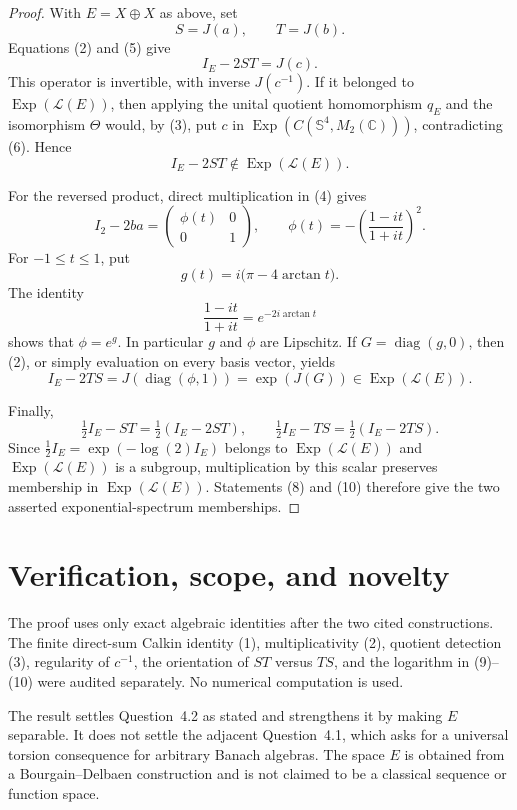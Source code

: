 \documentclass[11pt]{article}
\theoremstyle{remark}
\newcommand{\C}{\mathbb C}
\newcommand{\Sph}{\mathbb S}
\newcommand{\cL}{\mathcal L}
\newcommand{\Exp}{\operatorname{Exp}}
\begin{document}
\begin{proof}
With $E=X\oplus X$ as above, set
\[
 S=J(a),\qquad T=J(b).
\]
Equations (2) and (5) give
\[
 I_E-2ST=J(c).                                               \tag{7}
\]
This operator is invertible, with inverse $J(c^{-1})$.  If it belonged to
$\Exp(\cL(E))$, then applying the unital quotient homomorphism $q_E$ and the
isomorphism $\Theta$ would, by (3), put $c$ in
$\Exp(C(\Sph^4,M_2(\C)))$, contradicting (6).  Hence
\[
 I_E-2ST\notin\Exp(\cL(E)).                                 \tag{8}
\]

For the reversed product, direct multiplication in (4) gives
\[
 I_2-2ba=\begin{pmatrix}\phi(t)&0\\0&1\end{pmatrix},\qquad
 \phi(t)=-\left(\frac{1-it}{1+it}\right)^2.                \tag{9}
\]
For $-1\le t\le1$, put
\[
 g(t)=i\bigl(\pi-4\arctan t\bigr).
\]
The identity
\[
 \frac{1-it}{1+it}=e^{-2i\arctan t}
\]
shows that $\phi=e^g$.  In particular $g$ and $\phi$ are Lipschitz.  If
$G=\operatorname{diag}(g,0)$, then (2), or simply evaluation on every basis
vector, yields
\[
 I_E-2TS
 =J(\operatorname{diag}(\phi,1))
 =\exp(J(G))\in\Exp(\cL(E)).                                \tag{10}
\]

Finally,
\[
 \tfrac12I_E-ST=\tfrac12(I_E-2ST),\qquad
 \tfrac12I_E-TS=\tfrac12(I_E-2TS).
\]
Since $\tfrac12I_E=\exp(-\log(2)I_E)$ belongs to
$\Exp(\cL(E))$ and $\Exp(\cL(E))$ is a subgroup, multiplication by this
scalar preserves membership in $\Exp(\cL(E))$.  Statements (8) and (10)
therefore give the two asserted exponential-spectrum memberships.
\end{proof}

\section{Verification, scope, and novelty}

The proof uses only exact algebraic identities after the two cited
constructions.  The finite direct-sum Calkin identity (1), multiplicativity
(2), quotient detection (3), regularity of $c^{-1}$, the orientation of
$ST$ versus $TS$, and the logarithm in (9)--(10) were audited separately.
No numerical computation is used.

The result settles Question~4.2 as stated and strengthens it by making $E$
separable.  It does not settle the adjacent Question~4.1, which asks for a
universal torsion consequence for arbitrary Banach algebras.  The space $E$
is obtained from a Bourgain--Delbaen construction and is not claimed to be a
classical sequence or function space.
\end{document}

